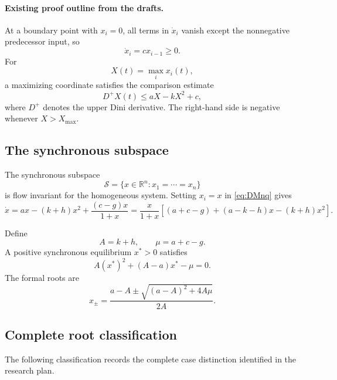 \documentclass[11pt, reqno]{amsart}
\theoremstyle{definition}
\theoremstyle{remark}
\newcommand{\R}{\mathbb{R}}
\begin{document}
	\paragraph{Existing proof outline from the drafts.}
	At a boundary point with $x_i=0$, all terms in $\dot x_i$ vanish except the
	nonnegative predecessor input, so
	\[
	\dot x_i=cx_{i-1}\ge0.
	\]
	For
	\[
	X(t)=\max_i x_i(t),
	\]
	a maximizing coordinate satisfies the comparison estimate
	\[
	D^+X(t)\le aX-kX^2+c,
	\]
	where $D^+$ denotes the upper Dini derivative.  The right-hand side is negative
	whenever $X>X_{\max}$.
	
	
	\subsection{The synchronous subspace}
	
	The synchronous subspace
	\[
	\mathcal S=\{x\in\R^n:x_1=\cdots=x_n\}
	\]
	is flow invariant for the homogeneous system.  Setting $x_i=x$ in
	\eqref{eq:DMnq} gives
	\begin{equation}
		\label{eq:synchronous-scalar}
		\dot x
		=
		a x-(k+h)x^2+\frac{(c-g)x}{1+x}
		=
		\frac{x}{1+x}
		\left[
		(a+c-g)+(a-k-h)x-(k+h)x^2
		\right].
	\end{equation}
	
	Define
	\begin{equation}
		\label{eq:A-mu}
		A=k+h,
		\qquad
		\mu=a+c-g.
	\end{equation}
	A positive synchronous equilibrium $x^*>0$ satisfies
	\begin{equation}
		\label{eq:synchronous-quadratic}
		A(x^*)^2+(A-a)x^*-\mu=0.
	\end{equation}
	The formal roots are
	\begin{equation}
		\label{eq:synchronous-roots}
		x_{\pm}
		=
		\frac{a-A\pm\sqrt{(a-A)^2+4A\mu}}{2A}.
	\end{equation}
	
	\subsection{Complete root classification}
	
	The following classification records the complete case distinction identified
	in the research plan.
	
\end{document}
